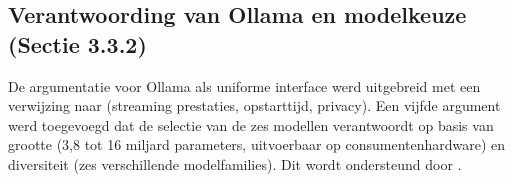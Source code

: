 \subsection{Verantwoording van Ollama en modelkeuze (Sectie 3.3.2)}
De argumentatie voor Ollama als uniforme interface werd uitgebreid met een verwijzing naar \autocite{Rajesh2025} (streaming prestaties, opstarttijd, privacy). Een vijfde argument werd toegevoegd dat de selectie van de zes modellen verantwoordt op basis van grootte (3,8 tot 16 miljard parameters, uitvoerbaar op consumentenhardware) en diversiteit (zes verschillende modelfamilies). Dit wordt ondersteund door \autocite{LopezEspejel2025}.